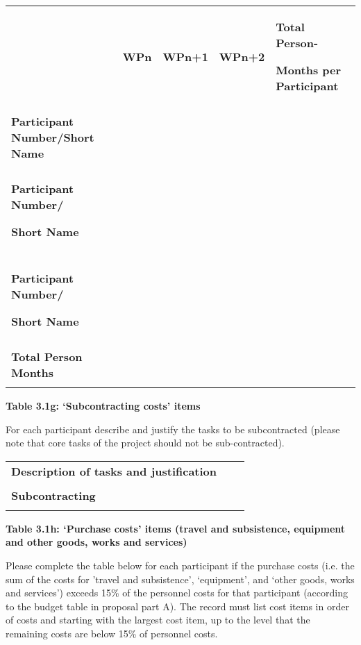 \begin{longtable}[]{@{}
  >{\raggedright\arraybackslash}p{}
  >{\raggedright\arraybackslash}p{}
  >{\raggedright\arraybackslash}p{}
  >{\raggedright\arraybackslash}p{}
  >{\raggedright\arraybackslash}p{}@{}}
\toprule
\endhead
& \textbf{WPn} & \textbf{WPn+1} & \textbf{WPn+2} & \textbf{Total
Person-}

\textbf{Months per Participant} \\
& & & & \\
\textbf{Participant Number/Short Name} & & & & \\
& & & & \\
\textbf{Participant Number/}

\textbf{Short Name} & & & & \\
& & & & \\
\textbf{Participant Number/}

\textbf{Short Name} & & & & \\
& & & & \\
\textbf{Total Person Months} & & & & \\
& & & & \\
\bottomrule
\end{longtable}

\textbf{Table 3.1g: `Subcontracting costs' items }

For each participant describe and justify the tasks to be subcontracted
(please note that core tasks of the project should not be
sub-contracted).

\begin{longtable}[]{@{}lll@{}}
\toprule
\endhead
\textbf{Description of tasks and justification} & & \\
& & \\
\textbf{Subcontracting } & & \\
& & \\
\bottomrule
\end{longtable}

\textbf{Table 3.1h: `Purchase costs' items (travel and subsistence,
equipment and other goods, works and services) }

Please complete the table below for each participant if the purchase
costs (i.e. the sum of the costs for 'travel and subsistence',
`equipment', and `other goods, works and services') exceeds 15\% of the
personnel costs for that participant (according to the budget table in
proposal part A). The record must list cost items in order of costs and
starting with the largest cost item, up to the level that the remaining
costs are below 15\% of personnel costs.

